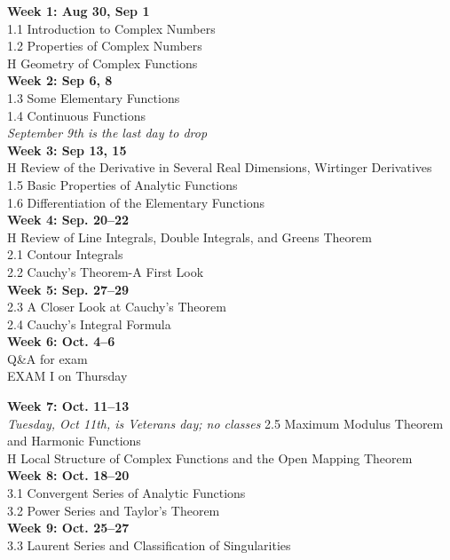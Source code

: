 \documentclass[11pt]{article}
\begin{document}
{\bf Week 1: Aug 30, Sep 1}\\
1.1 Introduction to Complex Numbers\\
1.2 Properties of Complex Numbers\\
H Geometry of Complex Functions\\


{\bf Week 2: Sep 6, 8}\\ 
1.3 Some Elementary Functions\\
1.4 Continuous Functions\\
\textit{September 9th is the last day to drop}\\

{\bf Week 3: Sep 13, 15}\\ 
H Review of the Derivative in Several Real Dimensions, Wirtinger Derivatives\\
1.5 Basic Properties of Analytic Functions\\
1.6 Differentiation of the Elementary Functions\\

{\bf Week 4: Sep. 20--22}\\ 
H Review of Line Integrals, Double Integrals, and Greens Theorem\\
2.1 Contour Integrals\\
2.2 Cauchy's Theorem-A First Look\\

{\bf Week 5: Sep. 27--29}\\
2.3 A Closer Look at Cauchy's Theorem\\
2.4 Cauchy's Integral Formula\\

{\bf Week 6: Oct. 4--6}\\
Q\&A for exam\\
EXAM I on Thursday\\ 
\newpage

{\bf Week 7: Oct. 11--13}\\
\textit{Tuesday, Oct 11th, is Veterans day; no classes}
2.5 Maximum Modulus Theorem and Harmonic Functions\\
H Local Structure of Complex Functions and the Open Mapping Theorem\\

{\bf Week 8: Oct. 18--20}\\
3.1 Convergent Series of Analytic Functions\\
3.2 Power Series and Taylor's Theorem\\

{\bf Week 9: Oct. 25--27}\\
3.3 Laurent Series and Classification of Singularities  \\
\end{document}
